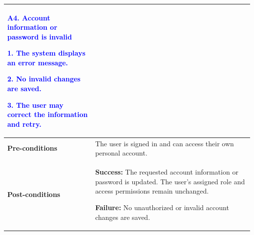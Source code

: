 \begin{longtable}{|p{}|p{}|}
\textcolor{blue}{\textbf{A4. Account information or password is invalid}}\par
\textcolor{blue}{1. The system displays an error message.}\par
\textcolor{blue}{2. No invalid changes are saved.}\par
\textcolor{blue}{3. The user may correct the information and retry.}
\\ \hline
\textbf{Pre-conditions} &
The user is signed in and can access their own personal account.
\\ \hline
\textbf{Post-conditions} &
\textbf{Success:} The requested account information or password is updated. The user's assigned role and access permissions remain unchanged.\par
\textbf{Failure:} No unauthorized or invalid account changes are saved.
\\ \hline
\end{longtable}